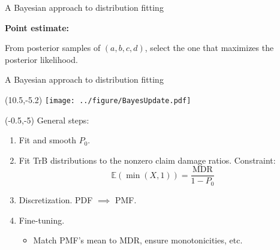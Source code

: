 \documentclass[aspectratio=169]{beamer}
\begin{document}
\begin{frame}{A Bayesian approach to distribution fitting}
\begin{textblock}{10}
\begin{enumerate}
\begin{itemize}
\end{itemize}

\end{enumerate}
\medskip

\tiny\textbf{Point estimate:}\medskip

\tiny From posterior samples of $(a, b, c, d)$, select the one that maximizes the posterior likelihood.

\end{textblock}
\end{frame}


\begin{frame}{A Bayesian approach to distribution fitting}
\begin{textblock}{1}(10.5,-5.2)
\texttt{[image: ../figure/BayesUpdate.pdf]}
\end{textblock}

\begin{textblock}{9}(-0.5,-5)
General steps:\medskip

\begin{enumerate}
\item Fit and smooth $P_0$.\medskip%

\item Fit TrB distributions to the nonzero claim damage ratios. Constraint:
\begin{equation*}
\mathbb{E}(\min(X, 1)) = \frac{\text{MDR}}{1 - P_0}
\end{equation*}%

\item Discretization. PDF $\implies$ PMF.\medskip%

\item Fine-tuning.\medskip

\begin{itemize}
\item Match PMF's mean to MDR, ensure monotonicities, etc.
\end{itemize}

\end{enumerate}




\end{textblock}

\end{frame}
\end{document}
